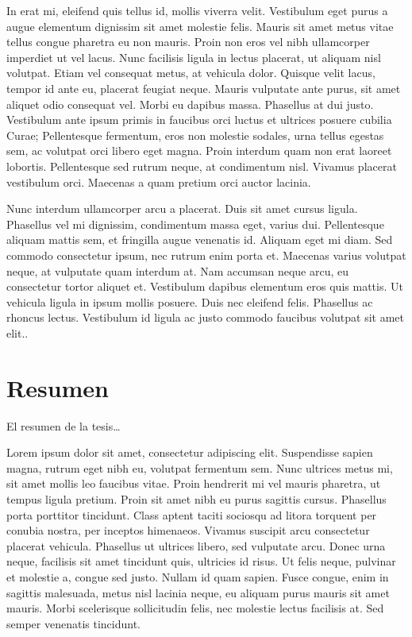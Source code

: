 In erat mi, eleifend quis tellus id, mollis viverra velit. Vestibulum eget purus a augue elementum dignissim sit amet molestie felis. Mauris sit amet metus vitae tellus congue pharetra eu non mauris. Proin non eros vel nibh ullamcorper imperdiet ut vel lacus. Nunc facilisis ligula in lectus placerat, ut aliquam nisl volutpat. Etiam vel consequat metus, at vehicula dolor. Quisque velit lacus, tempor id ante eu, placerat feugiat neque. Mauris vulputate ante purus, sit amet aliquet odio consequat vel. Morbi eu dapibus massa. Phasellus at dui justo. Vestibulum ante ipsum primis in faucibus orci luctus et ultrices posuere cubilia Curae; Pellentesque fermentum, eros non molestie sodales, urna tellus egestas sem, ac volutpat orci libero eget magna. Proin interdum quam non erat laoreet lobortis. Pellentesque sed rutrum neque, at condimentum nisl. Vivamus placerat vestibulum orci. Maecenas a quam pretium orci auctor lacinia.


Nunc interdum ullamcorper arcu a placerat. Duis sit amet cursus ligula. Phasellus vel mi dignissim, condimentum massa eget, varius dui. Pellentesque aliquam mattis sem, et fringilla augue venenatis id. Aliquam eget mi diam. Sed commodo consectetur ipsum, nec rutrum enim porta et. Maecenas varius volutpat neque, at vulputate quam interdum at. Nam accumsan neque arcu, eu consectetur tortor aliquet et. Vestibulum dapibus elementum eros quis mattis. Ut vehicula ligula in ipsum mollis posuere. Duis nec eleifend felis. Phasellus ac rhoncus lectus. Vestibulum id ligula ac justo commodo faucibus volutpat sit amet elit..

\newpage
\cleardoublepage

\chapter*{Resumen}
El resumen de la tesis\dots

Lorem ipsum dolor sit amet, consectetur adipiscing elit. Suspendisse sapien magna, rutrum eget nibh eu, volutpat fermentum sem. Nunc ultrices metus mi, sit amet mollis leo faucibus vitae. Proin hendrerit mi vel mauris pharetra, ut tempus ligula pretium. Proin sit amet nibh eu purus sagittis cursus. Phasellus porta porttitor tincidunt. Class aptent taciti sociosqu ad litora torquent per conubia nostra, per inceptos himenaeos. Vivamus suscipit arcu consectetur placerat vehicula. Phasellus ut ultrices libero, sed vulputate arcu. Donec urna neque, facilisis sit amet tincidunt quis, ultricies id risus. Ut felis neque, pulvinar et molestie a, congue sed justo. Nullam id quam sapien. Fusce congue, enim in sagittis malesuada, metus nisl lacinia neque, eu aliquam purus mauris sit amet mauris. Morbi scelerisque sollicitudin felis, nec molestie lectus facilisis at. Sed semper venenatis tincidunt.

